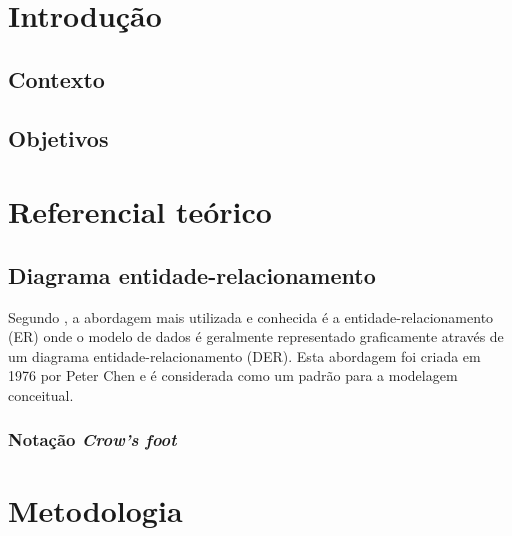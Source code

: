 \chapter[Elementos do Texto]{Introdução}

\section{Contexto}

\section{Objetivos}

\chapter{Referencial teórico}

\section{Diagrama entidade-relacionamento}
Segundo  , a abordagem mais utilizada e conhecida é a 
entidade-relacionamento (ER) onde o modelo de dados é geralmente representado graficamente através
de um diagrama entidade-relacionamento (DER). Esta abordagem foi criada em 1976 por Peter Chen e
é considerada como um padrão para a modelagem conceitual.



\subsection{Notação \textit{Crow's foot} }




\chapter{Metodologia}


